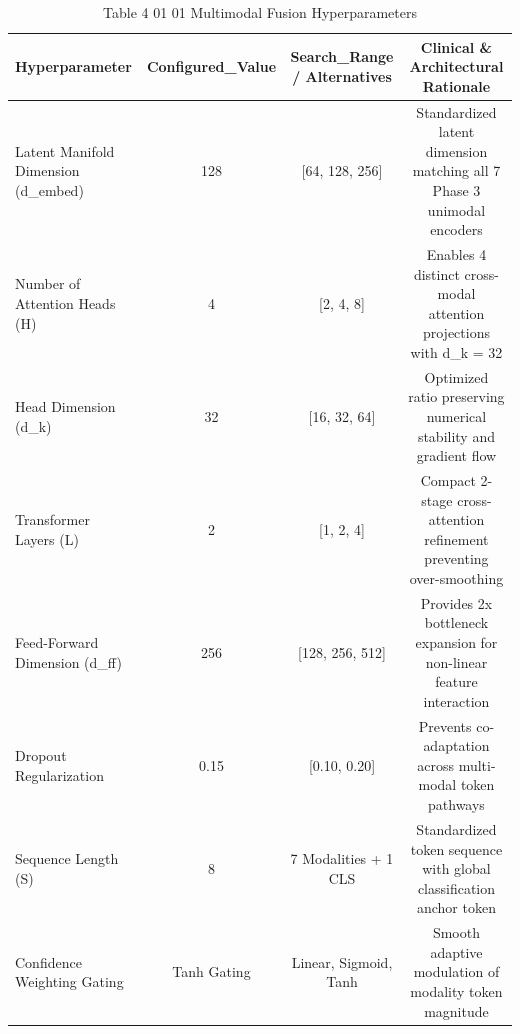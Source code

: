 \begin{table}[htbp]
\centering
\small
\begin{tabular}{lccc}
\hline
Hyperparameter & Configured\_Value & Search\_Range / Alternatives & Clinical \& Architectural Rationale \\
\hline
Latent Manifold Dimension (d\_embed) & 128 & [64, 128, 256] & Standardized latent dimension matching all 7 Phase 3 unimodal encoders \\
Number of Attention Heads (H) & 4 & [2, 4, 8] & Enables 4 distinct cross-modal attention projections with d\_k = 32 \\
Head Dimension (d\_k) & 32 & [16, 32, 64] & Optimized ratio preserving numerical stability and gradient flow \\
Transformer Layers (L) & 2 & [1, 2, 4] & Compact 2-stage cross-attention refinement preventing over-smoothing \\
Feed-Forward Dimension (d\_ff) & 256 & [128, 256, 512] & Provides 2x bottleneck expansion for non-linear feature interaction \\
Dropout Regularization & 0.15 & [0.10, 0.20] & Prevents co-adaptation across multi-modal token pathways \\
Sequence Length (S) & 8 & 7 Modalities + 1 CLS & Standardized token sequence with global classification anchor token \\
Confidence Weighting Gating & Tanh Gating & Linear, Sigmoid, Tanh & Smooth adaptive modulation of modality token magnitude \\
\hline
\end{tabular}
\caption{Table 4 01 01 Multimodal Fusion Hyperparameters}
\label{tab:table_4_01_01_multimodal_fusion_hyperparameters}
\end{table}
